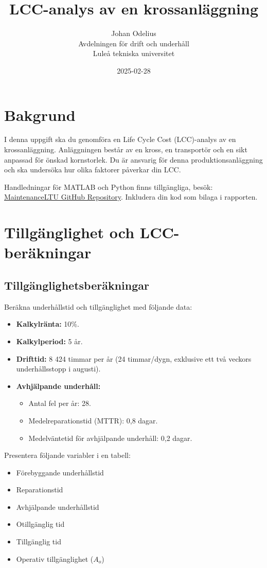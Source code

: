 \documentclass[a4paper,12pt]{exam}
\title{LCC-analys av en krossanläggning}
\author{Johan Odelius \\
        Avdelningen för drift och underhåll \\
        Lule\aa{} tekniska universitet}
\date{2025-02-28}
\begin{document}
\maketitle

\section*{Bakgrund}
I denna uppgift ska du genomföra en Life Cycle Cost (LCC)-analys av en krossanläggning. Anläggningen består av en kross, en transportör och en sikt anpassad för önskad kornstorlek. Du är ansvarig för denna produktionsanläggning och ska undersöka hur olika faktorer påverkar din LCC.

Handledningar för MATLAB och Python finns tillgängliga, besök:  
\href{https://github.com/MaintenanceLTU/D0002B/tree/main/Maintenance%20Cost%20and%20LCC}{MaintenanceLTU GitHub Repository}. Inkludera din kod som bilaga i rapporten.

\section{Tillgänglighet och LCC-beräkningar}
\subsection{Tillgänglighetsberäkningar}
Beräkna underhållstid och tillgänglighet med följande data:
\begin{itemize}
    \item \textbf{Kalkylränta:} 10\%.
    \item \textbf{Kalkylperiod:} 5 år.
    \item \textbf{Drifttid:} 8 424 timmar per år (24 timmar/dygn, exklusive ett två veckors underhållsstopp i augusti).
    \item \textbf{Avhjälpande underhåll:}
    \begin{itemize}
        \item Antal fel per år: 28.
        \item Medelreparationstid (MTTR): 0,8 dagar.
        \item Medelväntetid för avhjälpande underhåll: 0,2 dagar.
    \end{itemize}
\end{itemize}
Presentera följande variabler i en tabell: 
\begin{itemize}
    \item Förebyggande underhållstid
    \item Reparationstid
    \item Avhjälpande underhållstid
    \item Otillgänglig tid
    \item Tillgänglig tid
    \item Operativ tillgänglighet ($A_o$)
\end{itemize}
\end{document}
